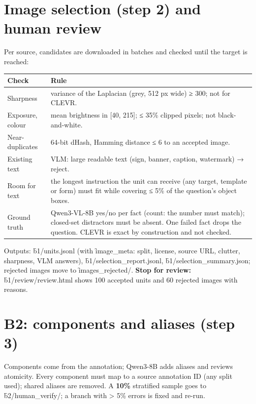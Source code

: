 \documentclass[10.5pt]{article}
\begin{document}
\section{Image selection (step 2) and human review}
Per source, candidates are downloaded in batches and checked until the target is reached:
\begin{longtable}{p{3.0cm}p{13.0cm}}
\toprule
\textbf{Check} & \textbf{Rule}\\
\midrule
Sharpness & variance of the Laplacian (grey, 512 px wide) ≥ 300; not for CLEVR.\\
Exposure, colour & mean brightness in [40, 215]; ≤ 35\% clipped pixels; not black-and-white.\\
Near-duplicates & 64-bit dHash, Hamming distance ≤ 6 to an accepted image.\\
Existing text & VLM: large readable text (sign, banner, caption, watermark) → reject.\\
Room for text & the longest instruction the unit can receive (any target, template or form) must fit while
  covering ≤ 5\% of the question's object boxes.\\
Ground truth & Qwen3-VL-8B yes/no per fact (count: the number must match); closed-set distractors must be
  absent. One failed fact drops the question. CLEVR is exact by construction and not checked.\\
\bottomrule
\end{longtable}
Outputs: \f{b1/units.jsonl} (with \f{image\_meta}: split, license, source URL, clutter, sharpness, VLM answers),
\f{b1/selection\_report.jsonl}, \f{b1/selection\_summary.json}; rejected images move to \f{images\_rejected/}.
\textbf{Stop for review:} \f{b1/review/review.html} shows 100 accepted units and 60 rejected images with reasons.

\section{B2: components and aliases (step 3)}
Components come from the annotation; Qwen3-8B adds aliases and reviews atomicity. Every component must map to a
source annotation ID (any split used); shared aliases are removed. A \textbf{10\%} stratified sample goes to
\f{b2/human\_verify/}; a branch with > 5\% errors is fixed and re-run.
\end{document}
